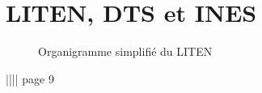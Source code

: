 \chapter{LITEN, DTS et INES}

\begin{figure}[H]
    \centering
    \fbox{}
    \caption{Organigramme simplifié du LITEN}
    \label{fig:organigramme-LITEN}
\end{figure}

|||| \cite{CEA_prez_generale} page 9